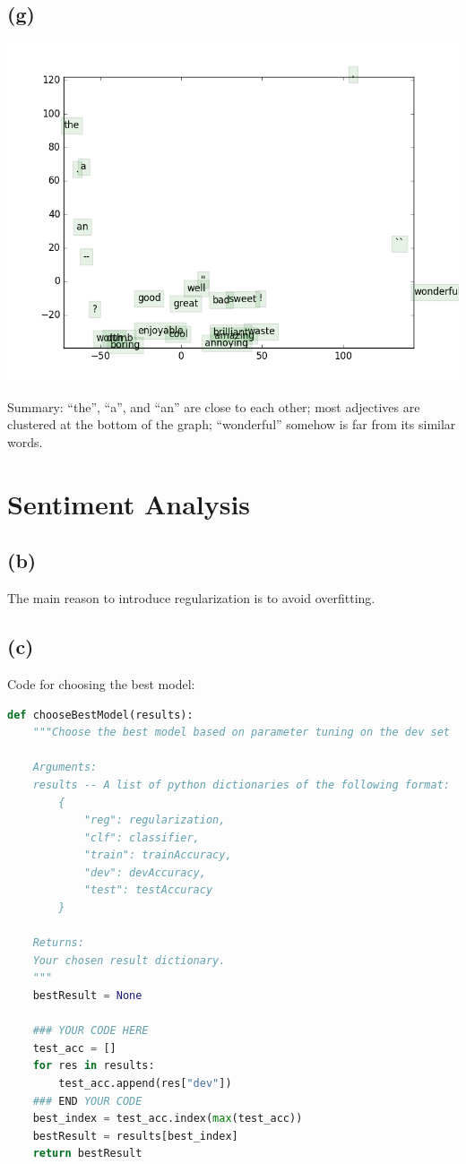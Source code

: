 \documentclass[12pt]{article}
\begin{document}
\subsection*{(g)}

\includegraphics[scale=0.8]{../assignment1/q3_word_vectors.png}

Summary: ``the'', ``a'', and ``an'' are close to each other; most adjectives are clustered at the bottom of the graph; ``wonderful'' somehow is far from its similar words. 

\section{Sentiment Analysis}

\subsection*{(b)}
The main reason to introduce regularization is to avoid overfitting. 

\subsection*{(c)}
Code for choosing the best model:
\begin{lstlisting}[language=Python]
def chooseBestModel(results):
    """Choose the best model based on parameter tuning on the dev set

    Arguments:
    results -- A list of python dictionaries of the following format:
        {
            "reg": regularization,
            "clf": classifier,
            "train": trainAccuracy,
            "dev": devAccuracy,
            "test": testAccuracy
        }

    Returns:
    Your chosen result dictionary.
    """
    bestResult = None

    ### YOUR CODE HERE
    test_acc = []
    for res in results:
        test_acc.append(res["dev"])
    ### END YOUR CODE
    best_index = test_acc.index(max(test_acc))
    bestResult = results[best_index]
    return bestResult
\end{lstlisting}
\end{document}
